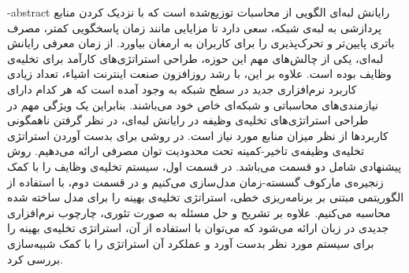 \esalatPage
\mojavezPage

 \newpage

% 
% 
% 
% 
% 
% 
\fa-abstract{
رایانش لبه‌ای الگویی از محاسبات توزیع‌شده است که با نزدیک کردن منابع پردازشی به لبه‌ی شبکه، سعی دارد تا مزایایی مانند زمان پاسخگویی کمتر، مصرف باتری پایین‌تر و تحرک‌پذیری را برای کاربران به ارمغان بیاورد. از زمان معرفی رایانش لبه‌ای، یکی از چالش‌های مهم این حوزه، طراحی استراتژی‌های کارآمد برای تخلیه‌ی وظایف بوده است. علاوه بر این، با رشد روزافزون صنعت اینترنت اشیاء، تعداد زیادی کاربرد نرم‌افزاری جدید در سطح شبکه به وجود آمده است که هر کدام دارای نیازمندی‌های محاسباتی و شبکه‌ای خاص خود می‌باشند. بنابراین یک ویژگی مهم در طراحی استراتژی‌های تخلیه‌ی وظیفه در رایانش لبه‌ای، در نظر گرفتن ناهمگونی کاربردها از نظر میزان منابع مورد نیاز است. در \CurrentProject روشی برای بدست آوردن استراتژی تخلیه‌ی وظیفه‌ی تاخیر-کمینه تحت محدودیت توان مصرفی ارائه می‌دهیم. روش پیشنهادی شامل دو قسمت می‌باشد. در قسمت اول، سیستم تخلیه‌ی وظایف را با کمک زنجیره‌ی مارکوف گسسته-زمان مدل‌سازی می‌کنیم و در قسمت دوم، با استفاده از الگوریتمی مبتنی بر برنامه‌ریزی خطی، استراتژی تخلیه‌ی بهینه را برای مدل ساخته شده محاسبه می‌کنیم. علاوه بر تشریح و حل مسئله به صورت تئوری، چارچوب نرم‌افزاری جدیدی در زبان  ارائه می‌شود که می‌توان با استفاده از آن، استراتژی تخلیه‌ی بهینه را برای سیستم مورد نظر بدست آورد و عملکرد آن استراتژی را با کمک شبیه‌سازی بررسی کرد.
}

\abstractPage

\newpage\clearpage